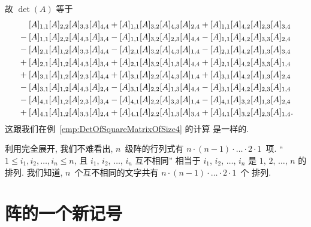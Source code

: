 \documentclass[../libro.tex]{subfiles}
\begin{document}
\begin{example}
    故 \(\det {(A)}\) 等于
    \begin{align*}
        & \hphantom{{} + {}}
        [A]_{1,1} [A]_{2,2} [A]_{3,3} [A]_{4,4}
        + [A]_{1,1} [A]_{3,2} [A]_{4,3} [A]_{2,4}
        + [A]_{1,1} [A]_{4,2} [A]_{2,3} [A]_{3,4}
        \\
        &
        - [A]_{1,1} [A]_{2,2} [A]_{4,3} [A]_{3,4}
        - [A]_{1,1} [A]_{3,2} [A]_{2,3} [A]_{4,4}
        - [A]_{1,1} [A]_{4,2} [A]_{3,3} [A]_{2,4}
        \\
        &
        - [A]_{2,1} [A]_{1,2} [A]_{3,3} [A]_{4,4}
        - [A]_{2,1} [A]_{3,2} [A]_{4,3} [A]_{1,4}
        - [A]_{2,1} [A]_{4,2} [A]_{1,3} [A]_{3,4}
        \\
        &
        + [A]_{2,1} [A]_{1,2} [A]_{4,3} [A]_{3,4}
        + [A]_{2,1} [A]_{3,2} [A]_{1,3} [A]_{4,4}
        + [A]_{2,1} [A]_{4,2} [A]_{3,3} [A]_{1,4}
        \\
        &
        + [A]_{3,1} [A]_{1,2} [A]_{2,3} [A]_{4,4}
        + [A]_{3,1} [A]_{2,2} [A]_{4,3} [A]_{1,4}
        + [A]_{3,1} [A]_{4,2} [A]_{1,3} [A]_{2,4}
        \\
        &
        - [A]_{3,1} [A]_{1,2} [A]_{4,3} [A]_{2,4}
        - [A]_{3,1} [A]_{2,2} [A]_{1,3} [A]_{4,4}
        - [A]_{3,1} [A]_{4,2} [A]_{2,3} [A]_{1,4}
        \\
        &
        - [A]_{4,1} [A]_{1,2} [A]_{2,3} [A]_{3,4}
        - [A]_{4,1} [A]_{2,2} [A]_{3,3} [A]_{1,4}
        - [A]_{4,1} [A]_{3,2} [A]_{1,3} [A]_{2,4}
        \\
        &
        + [A]_{4,1} [A]_{1,2} [A]_{3,3} [A]_{2,4}
        + [A]_{4,1} [A]_{2,2} [A]_{1,3} [A]_{3,4}
        + [A]_{4,1} [A]_{3,2} [A]_{2,3} [A]_{1,4}.
    \end{align*}
    这跟我们在例~\ref{emp:DetOfSquareMatrixOfSize4} 的计算%
    是一样的.
\end{example}

利用完全展开,
我们不难看出,
\(n\)~级阵的行列式有
\(n \cdot (n - 1) \cdot \dots \cdot 2 \cdot 1\)~项.
``\(1 \leq i_1, i_2, \dots, i_n \leq n\),
且 \(i_1\), \(i_2\), \(\dots\), \(i_n\) 互不相同''
相当于 \(i_1\), \(i_2\), \(\dots\), \(i_n\)
是 \(1\), \(2\), \(\dots\), \(n\) 的排列.
我们知道, \(n\)~个互不相同的文字共有
\(n \cdot (n - 1) \cdot \dots \cdot 2 \cdot 1\)~个%
排列.

\section{阵的一个新记号}
\end{document}
